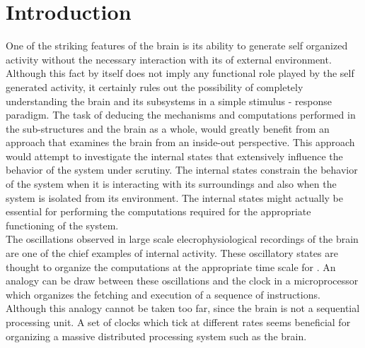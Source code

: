 \chapter{Introduction} 

\label{intro}

One of the striking features of the brain is its ability to generate self organized activity without the necessary interaction with its of external environment. Although this fact by itself does not imply any functional role played by the self generated activity, it certainly rules out the possibility of completely understanding the brain and its subsystems in a simple stimulus - response paradigm. The task of deducing the mechanisms and computations performed in the sub-structures and  the brain as a whole, would greatly benefit from an approach that examines the brain from an inside-out perspective. This approach would attempt to investigate the internal states that extensively influence the behavior of the system under scrutiny. The internal states constrain the behavior of the system when it is interacting with its surroundings and also when the system is isolated from its environment. The internal states might actually be essential for performing the computations required for the appropriate functioning of the system. \\

The oscillations observed in large scale elecrophysiological recordings of the brain are one of the chief examples of internal  activity. These oscillatory states are thought to organize the computations at the appropriate time scale for . An analogy can be draw between these oscillations and the clock in a microprocessor which organizes the fetching and execution of a sequence of instructions. Although this analogy cannot be taken too far, since the brain is not a sequential processing unit. A set of clocks which tick at different rates seems beneficial for organizing a massive distributed processing system such as the brain. \\

